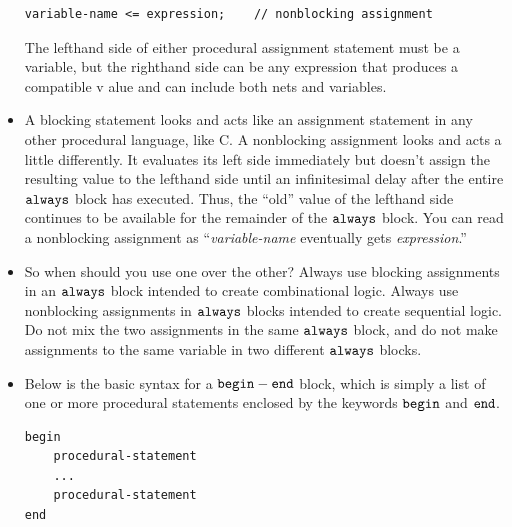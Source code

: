 \documentclass[10pt,a4paper]{article}
\begin{document}
\begin{itemize}
\begin{lstlisting}
variable-name <= expression;	// nonblocking assignment
\end{lstlisting}
The lefthand side of either procedural assignment statement must be a variable, but the righthand side can be any expression that produces a compatible v alue and can include both nets and variables.
\item A blocking statement looks and acts like an assignment statement in any other procedural language, like C. A nonblocking assignment looks and acts a little differently. It evaluates its left side immediately but doesn't assign the resulting value to the lefthand side until an infinitesimal delay after the entire $\tt{always}$ block has executed. Thus, the ``old'' value of the lefthand side continues to be available for the remainder of the $\tt{always}$ block. You can read a nonblocking assignment as ``\textit{variable-name} eventually gets \textit{expression}.''
\item So when should you use one over the other? Always use blocking assignments in an $\tt{always}$ block intended to create combinational logic. Always use nonblocking assignments in $\tt{always}$ blocks intended to create sequential logic. Do not mix the two assignments in the same $\tt{always}$ block, and do not make assignments to the same variable in two different $\tt{always}$ blocks.
\item Below is the basic syntax for a $\tt{begin-end}$ block, which is simply a list of one or more procedural statements enclosed by the keywords $\tt{begin}$ and $\tt{end}$. 
\begin{lstlisting}
begin
	procedural-statement
	...
	procedural-statement
end


\end{lstlisting}
\end{itemize}
\end{document}
